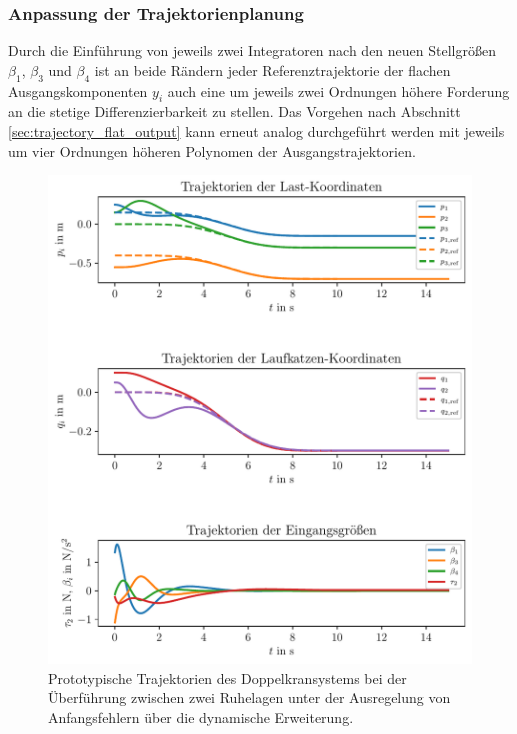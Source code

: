 \subsubsection{Anpassung der Trajektorienplanung}
Durch die Einführung von jeweils zwei Integratoren nach den neuen Stellgrößen $\beta_1$, $\beta_3$ und $\beta_4$ ist an beide Rändern jeder Referenztrajektorie der flachen Ausgangskomponenten $y_i$ auch eine um  jeweils zwei Ordnungen höhere Forderung an die stetige Differenzierbarkeit zu stellen. Das Vorgehen nach Abschnitt \ref{sec:trajectory_flat_output} kann erneut analog durchgeführt werden mit jeweils um vier Ordnungen höheren Polynomen der Ausgangstrajektorien.

\begin{figure}[H]
	\begin{center}
		\includegraphics[scale=1]{Pictures/dyn_controller_initial_error}
	\end{center}
	\caption[Trajektorien Ruhelagenüberführung mit Regelung über dynamische Erweiterung]
	{Prototypische Trajektorien des Doppelkransystems bei der Überführung zwischen zwei Ruhelagen unter der Ausregelung von Anfangsfehlern über die dynamische Erweiterung.}
	\label{fig_dyn_controller_initial_error}
\end{figure}


